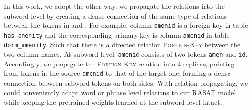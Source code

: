 \documentclass[11pt]{article}
\begin{document}
In this work, we adopt the other way: we propagate the relations into the subword level by creating a dense connection of the same type of relations between the tokens in  and . For example, column \texttt{amenid} is a foreign key in table \texttt{has\_amenity} and the corresponding primary key is column \texttt{amenid} in table \texttt{dorm\_amenity}. Such that there is a directed relation \textsc{Foreign-Key} between the two column names. At subword level, \texttt{amenid} consists of two tokens \texttt{amen} and \texttt{id}. Accordingly, we propagate the \textsc{Foreign-Key} relation into 4 replicas, pointing from tokens in the source \texttt{amenid} to that of the target one, forming a dense connection between subword tokens on both sides. With relation propagating, we could conveniently adapt word or phrase level relations to our RASAT model while keeping the pretrained weights learned at the subword level intact.

\begin{table}
\centering
{}
\caption{Dataset statistics for Spider, Spider-Realistic (\textit{Realistic} in table), SParC and CoSQL. For Spider and Spider-Realistic, the table shows the number of question-SQL pairs in the train-dev-test splits. For SParC and CoSQL, we list both the number of interactions and questions in the form of "\#interactions/\#questions".}
\label{tab:stat_for_datasets}
\end{table}
\end{document}
